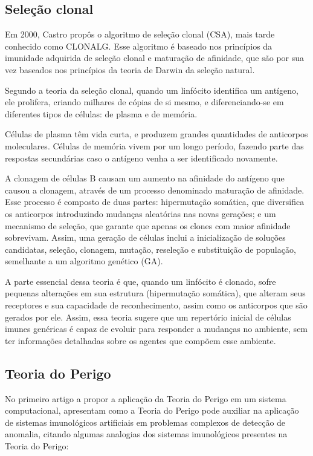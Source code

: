 \subsection{Seleção clonal}

Em 2000, Castro \cite{Castro2000} propôs o algoritmo de seleção clonal (CSA), mais tarde conhecido como CLONALG. Esse algoritmo é baseado nos princípios da imunidade adquirida de seleção clonal e maturação de afinidade, que são por sua vez baseados nos princípios da teoria de Darwin da seleção natural.

Segundo a teoria da seleção clonal, quando um linfócito identifica um antígeno, ele prolifera, criando milhares de cópias de si mesmo, e diferenciando-se em diferentes tipos de células: de plasma e de memória.

Células de plasma têm vida curta, e produzem grandes quantidades de anticorpos moleculares. Células de memória vivem por um longo período, fazendo parte das respostas secundárias caso o antígeno venha a ser identificado novamente.

A clonagem de células B causam um aumento na afinidade do antígeno que causou a clonagem, através de um processo denominado maturação de afinidade. Esse processo é composto de duas partes: hipermutação somática, que diversifica os anticorpos introduzindo mudanças aleatórias nas novas gerações; e um mecanismo de seleção, que garante que apenas os clones com maior afinidade sobrevivam. Assim, uma geração de células inclui a inicialização de soluções candidatas, seleção, clonagem, mutação, reseleção e substituição de população, semelhante a um algoritmo genético (GA).

A parte essencial dessa teoria é que, quando um linfócito é clonado, sofre pequenas alterações em sua estrutura (hipermutação somática), que alteram seus receptores e sua capacidade de reconhecimento, assim como os anticorpos que são gerados por ele. Assim, essa teoria sugere que um repertório inicial de células imunes genéricas é capaz de evoluir para responder a mudanças no ambiente, sem ter informações detalhadas sobre os agentes que compõem esse ambiente.

\subsection{Teoria do Perigo}

No primeiro artigo a propor a aplicação da Teoria do Perigo em um sistema computacional, \citeauthor{Aickelin2002} apresentam como a Teoria do Perigo pode auxiliar na aplicação de sistemas imunológicos artificiais em problemas complexos de detecção de anomalia, citando algumas analogias dos sistemas imunológicos presentes na Teoria do Perigo:

